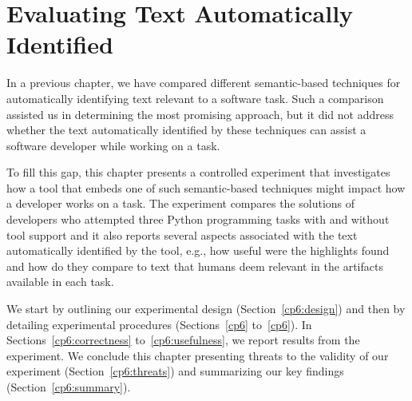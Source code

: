 \setcounter{chapter}{5}
\setcounter{rq}{1}


\chapter{Evaluating Text Automatically Identified}
\label{ch:assisting}




In a previous chapter, we have compared different semantic-based techniques for automatically identifying text relevant to a software task.
Such a comparison assisted us in determining the most promising approach, but it did not address whether 
the text automatically identified  
by these techniques can assist a software developer while working on a task.



To fill this gap, this chapter presents a controlled experiment that 
investigates how a tool that embeds one of such semantic-based techniques 
might impact how a developer works on a task. 
The experiment 
compares the solutions of developers who attempted three Python programming tasks with and without tool support
and it also reports several aspects associated with the text automatically identified by the tool,
e.g., how useful were the highlights found and how do they compare to text that humans deem relevant
in the artifacts available in each task.





We start by outlining our experimental design (Section~\ref{cp6:design}) and then 
by detailing experimental procedures (Sections~\ref{cp6} to~\ref{cp6}).
In Sections~\ref{cp6:correctness} to~\ref{cp6:usefulness}, we report results from the experiment.
We conclude this chapter presenting threats to the validity of our experiment (Section~\ref{cp6:threats}) and 
 summarizing our key findings (Section~\ref{cp6:summary}).


\clearpage













% 
% 





% 
% 

